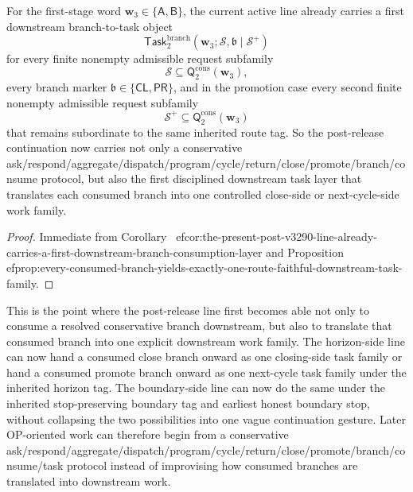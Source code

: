 \begin{corollary}
\label{cor:the-present-post-v3290-line-already-carries-a-first-downstream-branch-to-task-layer}
For the first-stage word \(\mathbf w_3\in\{\mathsf A,\mathsf B\}\), the current active line already carries a first downstream branch-to-task object
\[
 \mathsf{Task}^{\mathrm{branch}}_{2}(\mathbf w_3;\mathcal S,\mathfrak b\mid\mathcal S^{+})
\]
for every finite nonempty admissible request subfamily
\[
 \mathcal S\subseteq \mathsf{Q}^{\mathrm{cons}}_{2}(\mathbf w_3),
\]
every branch marker \(\mathfrak b\in\{\mathsf{CL},\mathsf{PR}\}\), and in the promotion case every second finite nonempty admissible request subfamily
\[
 \mathcal S^{+}\subseteq \mathsf{Q}^{\mathrm{cons}}_{2}(\mathbf w_3)
\]
that remains subordinate to the same inherited route tag. So the post-release continuation now carries not only a conservative ask/respond/aggregate/dispatch/program/cycle/return/close/promote/branch/consume protocol, but also the first disciplined downstream task layer that translates each consumed branch into one controlled close-side or next-cycle-side work family.
\end{corollary}

\begin{proof}
Immediate from Corollary~
ef{cor:the-present-post-v3290-line-already-carries-a-first-downstream-branch-consumption-layer} and Proposition~
ef{prop:every-consumed-branch-yields-exactly-one-route-faithful-downstream-task-family}.
\end{proof}

\begin{remark}
\label{rem:what-the-first-downstream-branch-to-task-layer-now-buys}
This is the point where the post-release line first becomes able not only to consume a resolved conservative branch downstream, but also to translate that consumed branch into one explicit downstream work family. The horizon-side line can now hand a consumed close branch onward as one closing-side task family or hand a consumed promote branch onward as one next-cycle task family under the inherited horizon tag. The boundary-side line can now do the same under the inherited stop-preserving boundary tag and earliest honest boundary stop, without collapsing the two possibilities into one vague continuation gesture. Later OP-oriented work can therefore begin from a conservative ask/respond/aggregate/dispatch/program/cycle/return/close/promote/branch/consume/task protocol instead of improvising how consumed branches are translated into downstream work.
\end{remark}



